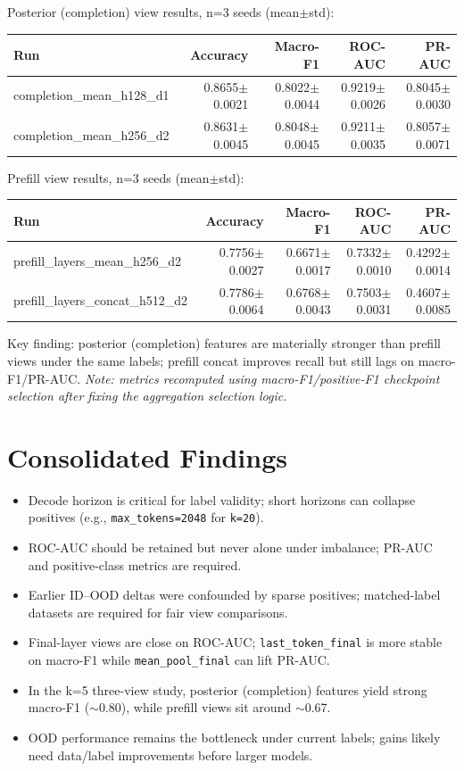\documentclass[11pt]{article}
\begin{document}
\noindent
Posterior (completion) view results, n=3 seeds (mean$\pm$std):
\begin{center}
\begin{tabular}{@{}lrrrr@{}}
\toprule
Run & Accuracy & Macro-F1 & ROC-AUC & PR-AUC \\
\midrule
completion\_mean\_h128\_d1 & 0.8655$\pm$0.0021 & 0.8022$\pm$0.0044 & 0.9219$\pm$0.0026 & 0.8045$\pm$0.0030 \\
completion\_mean\_h256\_d2 & 0.8631$\pm$0.0045 & 0.8048$\pm$0.0045 & 0.9211$\pm$0.0035 & 0.8057$\pm$0.0071 \\
\bottomrule
\end{tabular}
\end{center}

\noindent
Prefill view results, n=3 seeds (mean$\pm$std):
\begin{center}
\begin{tabular}{@{}lrrrr@{}}
\toprule
Run & Accuracy & Macro-F1 & ROC-AUC & PR-AUC \\
\midrule
prefill\_layers\_mean\_h256\_d2 & 0.7756$\pm$0.0027 & 0.6671$\pm$0.0017 & 0.7332$\pm$0.0010 & 0.4292$\pm$0.0014 \\
prefill\_layers\_concat\_h512\_d2 & 0.7786$\pm$0.0064 & 0.6768$\pm$0.0043 & 0.7503$\pm$0.0031 & 0.4607$\pm$0.0085 \\
\bottomrule
\end{tabular}
\end{center}

\noindent
Key finding: posterior (completion) features are materially stronger than prefill views under the same labels; prefill concat improves recall but still lags on macro-F1/PR-AUC.
\newline
\noindent\textit{Note: metrics recomputed using macro-F1/positive-F1 checkpoint selection after fixing the aggregation selection logic.}

\section*{Consolidated Findings}
\begin{itemize}
  \item Decode horizon is critical for label validity; short horizons can collapse positives (e.g., \texttt{max\_tokens=2048} for \texttt{k=20}).
  \item ROC-AUC should be retained but never alone under imbalance; PR-AUC and positive-class metrics are required.
  \item Earlier ID--OOD deltas were confounded by sparse positives; matched-label datasets are required for fair view comparisons.
  \item Final-layer views are close on ROC-AUC; \texttt{last\_token\_final} is more stable on macro-F1 while \texttt{mean\_pool\_final} can lift PR-AUC.
  \item In the k=5 three-view study, posterior (completion) features yield strong macro-F1 ($\sim$0.80), while prefill views sit around $\sim$0.67.
  \item OOD performance remains the bottleneck under current labels; gains likely need data/label improvements before larger models.
\end{itemize}
\end{document}
